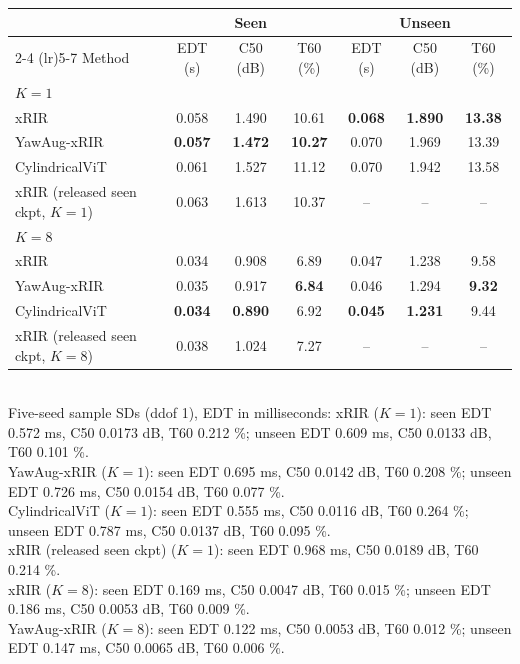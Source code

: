 \begin{table}[t]
\centering
\begin{tabular}{lcccccc}
\toprule
& \multicolumn{3}{c}{Seen} & \multicolumn{3}{c}{Unseen} \\
\cmidrule(lr){2-4} \cmidrule(lr){5-7}
Method & EDT (s) & C50 (dB) & T60 (\%) & EDT (s) & C50 (dB) & T60 (\%) \\
\midrule
\multicolumn{7}{l}{$K = 1$} \\
xRIR & 0.058 & 1.490 & 10.61 & \textbf{0.068} & \textbf{1.890} & \textbf{13.38} \\
YawAug-xRIR & \textbf{0.057} & \textbf{1.472} & \textbf{10.27} & 0.070 & 1.969 & 13.39 \\
CylindricalViT & 0.061 & 1.527 & 11.12 & 0.070 & 1.942 & 13.58 \\
xRIR (released seen ckpt, $K = 1$) & 0.063 & 1.613 & 10.37 & -- & -- & -- \\
\midrule
\multicolumn{7}{l}{$K = 8$} \\
xRIR & 0.034 & 0.908 & 6.89 & 0.047 & 1.238 & 9.58 \\
YawAug-xRIR & 0.035 & 0.917 & \textbf{6.84} & 0.046 & 1.294 & \textbf{9.32} \\
CylindricalViT & \textbf{0.034} & \textbf{0.890} & 6.92 & \textbf{0.045} & \textbf{1.231} & 9.44 \\
xRIR (released seen ckpt, $K = 8$) & 0.038 & 1.024 & 7.27 & -- & -- & -- \\
\bottomrule
\end{tabular}
\\[2pt]
{\footnotesize Five-seed sample SDs (ddof 1), EDT in milliseconds:
xRIR ($K = 1$): seen EDT 0.572 ms, C50 0.0173 dB, T60 0.212 \%; unseen EDT 0.609 ms, C50 0.0133 dB, T60 0.101 \%. \\
YawAug-xRIR ($K = 1$): seen EDT 0.695 ms, C50 0.0142 dB, T60 0.208 \%; unseen EDT 0.726 ms, C50 0.0154 dB, T60 0.077 \%. \\
CylindricalViT ($K = 1$): seen EDT 0.555 ms, C50 0.0116 dB, T60 0.264 \%; unseen EDT 0.787 ms, C50 0.0137 dB, T60 0.095 \%. \\
xRIR (released seen ckpt) ($K = 1$): seen EDT 0.968 ms, C50 0.0189 dB, T60 0.214 \%. \\
xRIR ($K = 8$): seen EDT 0.169 ms, C50 0.0047 dB, T60 0.015 \%; unseen EDT 0.186 ms, C50 0.0053 dB, T60 0.009 \%. \\
YawAug-xRIR ($K = 8$): seen EDT 0.122 ms, C50 0.0053 dB, T60 0.012 \%; unseen EDT 0.147 ms, C50 0.0065 dB, T60 0.006 \%. \\
}
\end{table}
